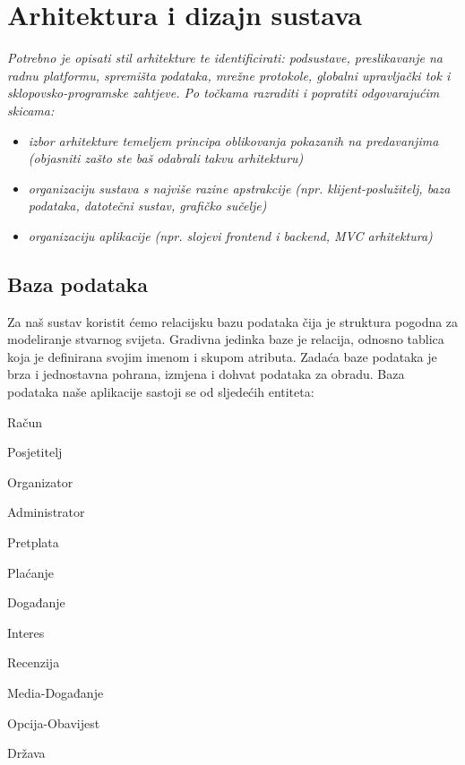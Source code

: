 \chapter{Arhitektura i dizajn sustava}
		

		\textit{ Potrebno je opisati stil arhitekture te identificirati: podsustave, preslikavanje na radnu platformu, spremišta podataka, mrežne protokole, globalni upravljački tok i sklopovsko-programske zahtjeve. Po točkama razraditi i popratiti odgovarajućim skicama:}
	\begin{itemize}
		\item 	\textit{izbor arhitekture temeljem principa oblikovanja pokazanih na predavanjima (objasniti zašto ste baš odabrali takvu arhitekturu)}
		\item 	\textit{organizaciju sustava s najviše razine apstrakcije (npr. klijent-poslužitelj, baza podataka, datotečni sustav, grafičko sučelje)}
		\item 	\textit{organizaciju aplikacije (npr. slojevi frontend i backend, MVC arhitektura) }		
	\end{itemize}

	
		
	\pagebreak
		

				
		\section{Baza podataka}
			
			
		
		\textrm{Za naš sustav koristit ćemo relacijsku bazu podataka čija je struktura pogodna za modeliranje stvarnog svijeta. Gradivna jedinka baze je relacija, odnosno tablica koja je definirana svojim imenom i skupom atributa. Zadaća baze podataka je brza i jednostavna pohrana, izmjena i dohvat podataka za obradu. Baza podataka naše aplikacije sastoji se od sljedećih entiteta:}
		
	\begin{packed_item}
		
	\item Račun
	\item Posjetitelj
	\item Organizator
	\item Administrator
	\item Pretplata
	\item Plaćanje
	\item Događanje
	\item Interes
	\item Recenzija
	\item Media-Događanje
	\item Opcija-Obavijest
	\item Država
	\end{packed_item}
		
